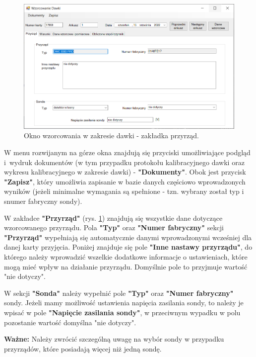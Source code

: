 \begin{figure}[htb]
	\centering
	\includegraphics[width=\columnwidth]{obrazki/Wzorcowanie/dawka/przyrzad.png}
	\caption{Okno wzorcowania w zakresie dawki - zakładka przyrząd.}
	\label{dawkaPrzyrzad}
\end{figure}

W menu rozwijanym na górze okna znajdują się przyciski umożliwiające podgląd i~wydruk dokumentów (w tym przypadku protokołu kalibracyjnego dawki oraz wykresu kalibracyjnego w zakresie dawki) - \textbf{"Dokumenty"}. Obok jest przycisk \textbf{"Zapisz"}, który umożliwia zapisanie w bazie danych częściowo wprowadzonych wyników (jeżeli minimalne wymagania są spełnione - tzn. wybrany został typ i snumer fabryczny sondy).

W zakładce \textbf{"Przyrząd"} (rys. \ref{dawkaPrzyrzad}) znajdują się wszystkie dane dotyczące wzorcowanego przyrządu. Pola \textbf{"Typ"} oraz \textbf{"Numer fabryczny"} sekcji \textbf{"Przyrząd"} wypełniają się automatycznie danymi wprowadzonymi wcześniej dla danej karty przyjęcia. Poniżej znajduje się pole \textbf{"Inne nastawy przyrządu"}, do którego należy wprowadzić wszelkie dodatkowe informacje o ustawieniach, które mogą mieć wpływ na działanie przyrządu. Domyślnie pole to przyjmuje wartość "nie dotyczy".

W sekcji \textbf{"Sonda"} należy wypełnić pole \textbf{"Typ"} oraz \textbf{"Numer fabryczny"} sondy. Jeżeli mamy możliwość ustawienia napięcia zasilania sondy, to należy je wpisać w pole \textbf{"Napięcie zasilania sondy"}, w przeciwnym wypadku w polu pozostanie wartość domyślna "nie dotyczy".

\textbf{Ważne:} Należy zwrócić szczególną uwagę na wybór sondy w przypadku przyrządów, które posiadają więcej niż jedną sondę.

